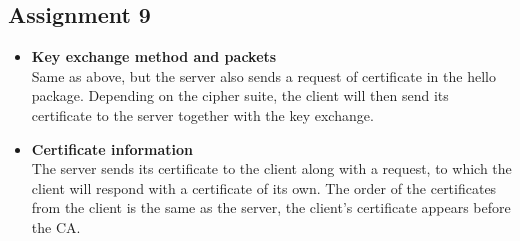 \documentclass[11pt,a4paper]{article}
\begin{document}
\subsection{Assignment 9}
\begin{itemize}
\item \textbf{Key exchange method and packets}\\ 
Same as above, but the server also sends a request of certificate in the hello package. Depending on the cipher suite, the client will then send its certificate to the server together with the key exchange.
\item \textbf{Certificate information}\\
The server sends its certificate to the client along with a request, to which the client will respond with a certificate of its own.
The order of the certificates from the client is the same as the server, the client's certificate appears before the CA.  
\end{itemize}

\newpage
\end{document}

